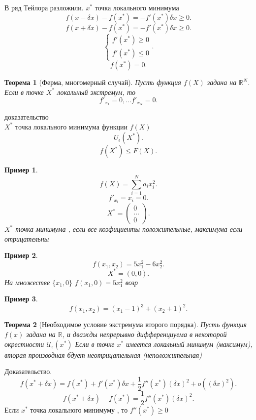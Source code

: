 \documentclass[14pt]{extarticle}
\newtheorem{theorem}{Теорема}
\newtheorem{example}{Пример}
\begin{document}
В ряд Тейлора разложили. $x^{*}$ точка локального минимума
\[
f(x- \delta x)  -f(x^{*}) = - f'(x^{*}) \delta x \ge 0
.\] 
\[
f(x+ \delta x)  -f(x^{*}) = - f'(x^{*}) \delta x \ge 0
.\] 
\[
	\begin{cases}
		f'(x^{*}) \ge 0\\
		f'(x^{*}) \le 0
	\end{cases}
.\] 
\[
f(x^{*}) = 0
.\] 
\begin{theorem}[Ферма, многомерный случай]
	Пусть функция $f(X)$ задана на  $\mathbb{R}^{N}$. Если в точке
	$X^{*}$ локальный экстремум, то 
	\[
	f'_{x_1} = 0,\dots f'_{x_{N}} = 0
	.\] 
\end{theorem}
доказательство\\
$X^{*}$ точка локального минимума функции $f(X)$
 \[
U_{\epsilon}(X^{*})
.\] 
\[
f(X^{*}) \le  F(X)
.\] 
\begin{example}
	\[
	f(X) =  \sum_{i =1}^{N} a_i x^2_{i}
	.\] 
	\[
	f'_{x_{i}} = x_{i} = 0
	.\] 
	\[
	X^{*} = \begin{pmatrix} 
	0\\
	\dots\\
	0
	\end{pmatrix} 
	.\] 
	$X^{*}$ точка минимума , если все коэфициенты положительные,
	максимума если отрицательны
\end{example}
\begin{example}
	\[
	f(x_1,x_2) = 5x_1^2 - 6x_2^2
	.\] 
	\[
	X^{*} = (0,0)
	.\] 
	На множестве $\{x_1,0\}$ $f(x_1,0) = 5x_1^2$ возр
\end{example}
\begin{example}
	\[
	f(x_1,x_2) = (x_1-1)^{3} + (x_2 + 1)^2
	.\] 
\end{example}
\begin{theorem}[Необходимое условие экстремума второго порядка]
	Пусть функция $f(x)$ задана на  $\mathbb{R}$, и дважды непрерывно
	дифференциуема в некоторой окрестности $\mathcal{U}_{\epsilon}(x^{*})$ 
	Если в точке $x^{*}$ имеется локальный минимум (максимум),
	вторая производная бдует неотрицательная (неположительная)
\end{theorem}
Доказательство.
\[
f(x^{*} + \delta x) = f(x^{*}) + f'(x^{*}) \delta x +
\frac{1}{2} f''(x^{*}) ( \delta x )^2 + o((\delta x)^2)
.\] 
\[
f(x^{*} + \delta x) - f(x^{*}) = \frac{1}{2} f''(x^{*}) (\delta x)^2
.\] 
Если $x^{*}$ точка локального минимуму , то $f''(x^{*}) \ge 0$\\
\end{document}
